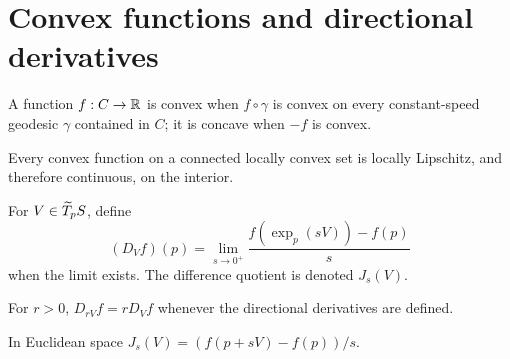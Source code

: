 \section{Convex functions and directional derivatives}

\begin{definition}
\label{def:chow-iii-h20-convex-function}
A function $f:C\to\mathbb R$ is convex when $f\circ\gamma$ is convex on every constant-speed
geodesic $\gamma$ contained in $C$; it is concave when $-f$ is convex.
\end{definition}

\begin{lemma}
\label{lem:chow-iii-h21-convex-locally-lipschitz}
Every convex function on a connected locally convex set is locally Lipschitz, and
therefore continuous, on the interior.
\end{lemma}

\begin{definition}
\label{def:chow-iii-h22-directional-derivative}
For $V\in\widetilde T_pS$, define
\[
(D_Vf)(p)=\lim_{s\to0^+}\frac{f(\exp_p(sV))-f(p)}{s}
\]
when the limit exists.  The difference quotient is denoted $J_s(V)$.
\end{definition}

\begin{lemma}
\label{lem:chow-iii-h23-directional-homogeneity}
For $r>0$, $D_{rV}f=rD_Vf$ whenever the directional derivatives are defined.
\end{lemma}

\begin{remark}
\label{rem:chow-iii-h24-euclidean-difference-quotient}
In Euclidean space $J_s(V)=(f(p+sV)-f(p))/s$.
\end{remark}

